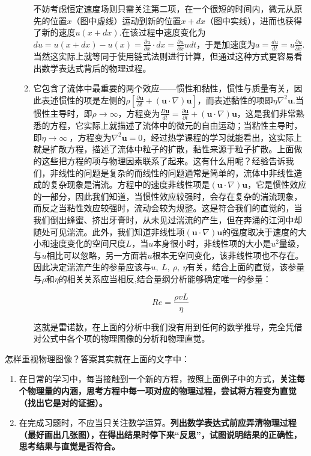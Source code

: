 \documentclass{ctexart}
\begin{document}
\begin{myexample}
\begin{enumerate}[leftmargin=*, labelsep=0.5em]
\begin{enumerate}[leftmargin=*, labelsep=0.5em]
      不妨考虑恒定速度场则只需关注第二项，在一个很短的时间内，微元从原先的位置$x$（图中虚线）运动到新的位置$x + dx$（图中实线），进而也获得了新的速度$u(x + dx)$.在该过程中速度变化为$du = u(x + dx) - u(x) = \frac{\partial u}{\partial x} \cdot dx = \frac{\partial u}{\partial x}udt$，于是加速度为$a = \frac{du}{dt} = u\frac{\partial u}{\partial x}$.当然这实际上就等同于使用链式法则进行计算，但通过这种方式更容易看出数学表达式背后的物理过程。
      
      \item 它包含了流体中最重要的两个效应——惯性和黏性，惯性与质量有关，因此表述惯性的项是左侧的$\rho\left\lbrack \frac{\partial\mathbf{u}}{\partial t} + \left( \mathbf{u} \cdot \nabla \right)\mathbf{u} \right\rbrack$，而表述黏性的项即$\eta\nabla^{2}\mathbf{u}$.当惯性主导时，即$\rho \rightarrow \infty$，方程变为$\frac{D\mathbf{u}}{dt} = \frac{\partial\mathbf{u}}{\partial t} + \left( \mathbf{u} \cdot \nabla \right)\mathbf{u}$，这是我们非常熟悉的方程，它实际上就描述了流体中的微元的自由运动；当粘性主导时，即$\eta \rightarrow \infty\ $，方程变为$\nabla^{2}\mathbf{u} = 0$，经过热学课程的学习就能看出，这实际上就是扩散方程，描述了流体中粒子的扩散，黏性来源于粒子扩散。上面做的这些把方程的项与物理因素联系了起来。这有什么用呢？经验告诉我们，非线性的问题是复杂的而线性的问题通常是简单的，流体中非线性造成的复杂现象是湍流。方程中的速度非线性项是$\left( \mathbf{u} \cdot \nabla \right)\mathbf{u}$，它是惯性效应的一部分，因此我们知道，当惯性效应较强时，会存在复杂的湍流现象，而反之当粘性效应较强时，流动会较为规整。这是符合我们的直觉的，当我们倒出蜂蜜、挤出牙膏时，从未见过湍流的产生，但在奔涌的江河中却随处可见湍流。此外，我们知道非线性项$\left( \mathbf{u} \cdot \nabla \right)\mathbf{u}$的强度取决于速度的大小和速度变化的空间尺度$L$，当$u$本身很小时，非线性项的大小是$u^{2}$量级，与$u$相比可以忽略，另一方面若$u$根本无空间变化，该非线性项也不存在。因此决定湍流产生的参量应该与$u,\ L,\ \rho,\ \eta$有关，结合上面的直觉，该参量与$\rho$和$\eta$的相关关系应当相反,结合量纲分析能够确定唯一的参量：
      
      \[Re = \frac{\rho vL}{\eta}\]
      
      这就是雷诺数，在上面的分析中我们没有用到任何的数学推导，完全凭借对公式中各个项的物理图像的分析和物理直觉。
    \end{enumerate}
\end{enumerate}
\end{myexample}

怎样重视物理图像？答案其实就在上面的文字中：

\begin{enumerate}[leftmargin=*, labelsep=0.5em]
\item 在日常的学习中，每当接触到一个新的方程，按照上面例子中的方式，\textbf{关注每个物理量的内涵，思考方程中每一项对应的物理过程，尝试将方程变为直觉（找出它是对的证据）。}

\item 在完成习题时，不应当只关注数学运算。\textbf{列出数学表达式前应弄清物理过程（最好画出几张图），在得出结果时停下来“反思”，试图说明结果的正确性，思考结果与直觉是否符合。}
\end{enumerate}
\end{document}
